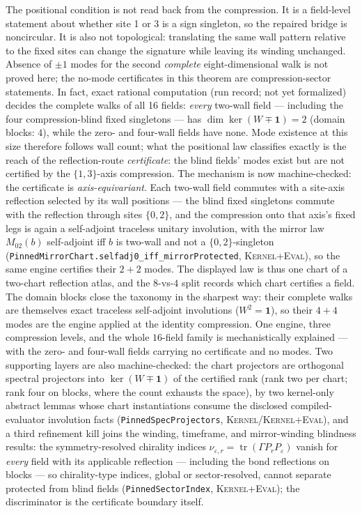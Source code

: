 \documentclass[11pt]{article}
\newcommand{\id}{\mathbf{1}}
\newcommand{\Kernel}{\textcolor{kernelcolor}{\textsc{Kernel}}}
\newcommand{\DraftTrust}{\textcolor{draftcolor}{\textsc{Kernel+Eval}}}
\begin{document}
The positional condition is not read back from the compression.  It is a
field-level statement about whether site 1 or 3 is a sign singleton, so the
repaired bridge is noncircular.  It is also not topological: translating the
same wall pattern relative to the fixed sites can change the signature while
leaving its winding unchanged.  Absence of $\pm1$ modes for the second
\emph{complete} eight-dimensional walk is not proved here; the no-mode
certificates in this theorem are compression-sector statements.  In fact,
exact rational computation (run record; not yet formalized) decides the
complete walks of all 16 fields: \emph{every} two-wall field --- including
the four compression-blind fixed singletons --- has
$\dim\ker(W\mp\id)=2$ (domain blocks: $4$), while the zero- and four-wall
fields have none.  Mode existence at this size therefore follows wall
count; what the positional law classifies exactly is the reach of the
reflection-route \emph{certificate}: the blind fields' modes exist but are
not certified by the $\{1,3\}$-axis compression.  The mechanism is now
machine-checked: the certificate is \emph{axis-equivariant}.  Each
two-wall field commutes with a site-axis reflection selected by its wall
positions --- the blind fixed singletons commute with the reflection
through sites $\{0,2\}$, and the compression onto that axis's fixed legs
is again a self-adjoint traceless unitary involution, with the mirror law
$M_{02}(b)$ self-adjoint iff $b$ is two-wall and not a $\{0,2\}$-singleton
(\texttt{PinnedMirrorChart.selfadj0\_iff\_mirrorProtected},
\DraftTrust{}), so the same engine certifies their $2+2$ modes.  The
displayed law is thus one chart of a two-chart reflection atlas, and the
$8$-vs-$4$ split records which chart certifies a field.  The domain
blocks close the taxonomy in the sharpest way: their complete walks are
themselves exact traceless self-adjoint involutions ($W^2=\id$), so their
$4+4$ modes are the engine applied at the identity compression.  One
engine, three compression levels, and the whole $16$-field family is
mechanistically explained --- with the zero- and four-wall fields
carrying no certificate and no modes.  Two supporting layers are also
machine-checked: the chart projectors are orthogonal spectral projectors
into $\ker(W\mp\id)$ of the certified rank (rank two per chart; rank four
on blocks, where the count exhausts the space), by two kernel-only
abstract lemmas whose chart instantiations consume the disclosed
compiled-evaluator involution facts
(\texttt{PinnedSpecProjectors}, \Kernel{}/\DraftTrust{}), and a third
refinement kill joins the
winding, timeframe, and mirror-winding blindness results: the
symmetry-resolved chirality indices
$\nu_{\varepsilon,r}=\operatorname{tr}(\Gamma P_r P_\varepsilon)$ vanish
for \emph{every} field with its applicable reflection --- including the
bond reflections on blocks --- so chirality-type indices, global or
sector-resolved, cannot separate protected from blind fields
(\texttt{PinnedSectorIndex}, \DraftTrust{}); the discriminator is the
certificate boundary itself.
\end{document}
